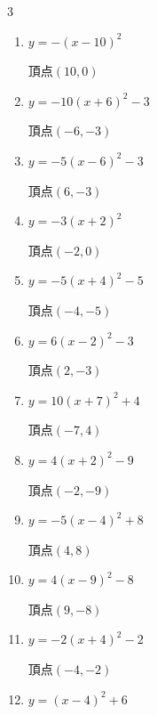 \begin{multicols}{3}
\begin{enumerate}
        $\displaystyle 頂点\left( -5 , -9 \right)$

  \item $\displaystyle y=-\left( x-10\right)^{2}$

        $\displaystyle 頂点\left( 10 , 0 \right)$

  \item $\displaystyle y=-10\left( x+6\right)^{2}-3$

        $\displaystyle 頂点\left( -6 , -3 \right)$

  \item $\displaystyle y=-5\left( x-6\right)^{2}-3$

        $\displaystyle 頂点\left( 6 , -3 \right)$

  \item $\displaystyle y=-3\left( x+2\right)^{2}$

        $\displaystyle 頂点\left( -2 , 0 \right)$

  \item $\displaystyle y=-5\left( x+4\right)^{2}-5$

        $\displaystyle 頂点\left( -4 , -5 \right)$

  \item $\displaystyle y=6\left( x-2\right)^{2}-3$

        $\displaystyle 頂点\left( 2 , -3 \right)$

  \item $\displaystyle y=10\left( x+7\right)^{2}+4$

        $\displaystyle 頂点\left( -7 , 4 \right)$

  \item $\displaystyle y=4\left( x+2\right)^{2}-9$

        $\displaystyle 頂点\left( -2 , -9 \right)$

  \item $\displaystyle y=-5\left( x-4\right)^{2}+8$

        $\displaystyle 頂点\left( 4 , 8 \right)$

  \item $\displaystyle y=4\left( x-9\right)^{2}-8$

        $\displaystyle 頂点\left( 9 , -8 \right)$

  \item $\displaystyle y=-2\left( x+4\right)^{2}-2$

        $\displaystyle 頂点\left( -4 , -2 \right)$

  \item $\displaystyle y=\left( x-4\right)^{2}+6$


\end{enumerate}
\end{multicols}
